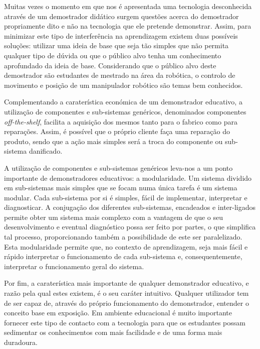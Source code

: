 Muitas vezes o momento em que nos é apresentada uma tecnologia desconhecida
através de um demostrador didático surgem questões acerca do demostrador
propriamente dito e não na tecnologia que ele pretende demonstrar. Assim,
para minimizar este tipo de interferência na aprendizagem existem duas
possíveis soluções: utilizar uma ideia de base que seja tão simples que
não permita qualquer tipo de dúvida ou que o público alvo tenha um
conhecimento aprofundado da ideia de base. Considerando que o público alvo
deste demostrador são estudantes de mestrado na área da robótica,
o controlo de movimento e posição de um manipulador robótico são temas
bem conhecidos.

Complementando a caraterística económica de um demonstrador educativo,
a utilização de componentes e sub-sistemas genéricos, denominados
componentes \emph{off-the-shelf}, facilita a aquisição dos mesmos tanto
para o fabrico como para reparações. Assim, é possível que o próprio
cliente faça uma reparação do produto, sendo que a ação mais simples será
a troca do componente ou sub-sistema danificado.

A utilização de componentes e sub-sistemas genéricos leva-nos a um ponto
importante de demonstradores educativos: a modularidade. Um sistema
dividido em sub-sistemas mais simples que se focam numa única tarefa é um
sistema modular. Cada sub-sistema por si é simples, fácil de implementar,
interpretar e diagnosticar. A conjugação dos diferentes sub-sistemas,
encadeados e inter-ligados permite obter um sistema mais complexo com a
vantagem de que o seu desenvolvimento e eventual diagnóstico possa ser
feito por partes, o que simplifica tal processo, proporcionando também a
possibilidade de este ser paralelizado. Esta modularidade permite que,
no contexto de aprendizagem, seja mais fácil e rápido interpretar o
funcionamento de cada sub-sistema e, consequentemente, interpretar o
funcionamento geral do sistema.

Por fim, a caraterística mais importante de qualquer demonstrador
educativo, e razão pela qual estes existem, é o seu caráter intuitivo.
Qualquer utilizador tem de ser capaz de, através do próprio funcionamento
do demonstrador, entender o conceito base em exposição. Em ambiente
educacional é muito importante fornecer este tipo de contacto com a
tecnologia para que os estudantes possam sedimentar os conhecimentos com
mais facilidade e de uma forma mais duradoura. %


